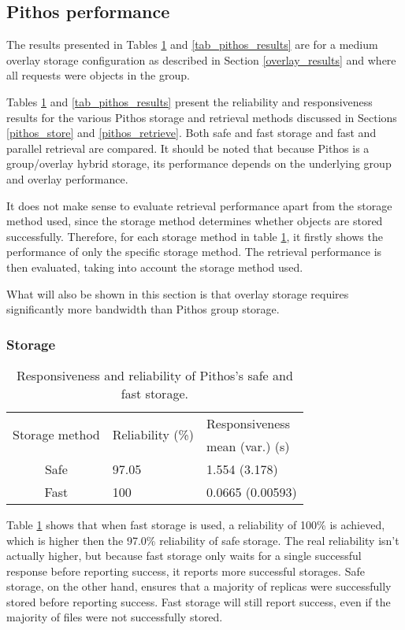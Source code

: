 \subsection{Pithos performance}
\label{pithos_resp_rel_results}

The results presented in Tables \ref{tab_pithos_storage_results} and \ref{tab_pithos_results} are for a medium overlay storage configuration as described in Section \ref{overlay_results} and where all requests were objects in the group.

Tables \ref{tab_pithos_storage_results} and \ref{tab_pithos_results} present the reliability and responsiveness results for the various Pithos storage and retrieval methods discussed in Sections \ref{pithos_store} and \ref{pithos_retrieve}. Both safe and fast storage and fast and parallel retrieval are compared. It should be noted that because Pithos is a group/overlay hybrid storage, its performance depends on the underlying group and overlay performance.

It does not make sense to evaluate retrieval performance apart from the storage method used, since the storage method determines whether objects are stored successfully. Therefore, for each storage method in table \ref{tab_pithos_storage_results}, it firstly shows the performance of only the specific storage method. The retrieval performance is then evaluated, taking into account the storage method used.

What will also be shown in this section is that overlay storage requires significantly more bandwidth than Pithos group storage.

\subsubsection{Storage}
\begin{table}[htbp]
\centering
\begin{tabular}{|c|l|l|}
\hline
\multirow{2}{*}{Storage method} & \multirow{2}{*}{Reliability (\%)} & Responsiveness \\
               &             & mean (var.) (s) \\
\hline
Safe    &  97.05  &   1.554 (3.178)  \\
Fast    &  100     &   0.0665 (0.00593) \\
\hline
\end{tabular}
\caption{Responsiveness and reliability of Pithos's safe and fast storage.}
\label{tab_pithos_storage_results}
\end{table}
%
Table \ref{tab_pithos_storage_results} shows that when fast storage is used, a reliability of 100\% is achieved, which is higher then the 97.0\% reliability of safe storage. The real reliability isn't actually higher, but because fast storage only waits for a single successful response before reporting success, it reports more successful storages. Safe storage, on the other hand, ensures that a majority of replicas were successfully stored before reporting success. Fast storage will still report success, even if the majority of files were not successfully stored.

